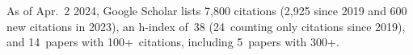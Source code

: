 %
As of Apr.~2 2024, Google Scholar lists
7,800 citations (2,925 since 2019 and 600 new citations in 2023),
an h-index of~38 (24~counting only citations since 2019),
and 14~papers with 100+~citations, including 5~papers with 300+.
